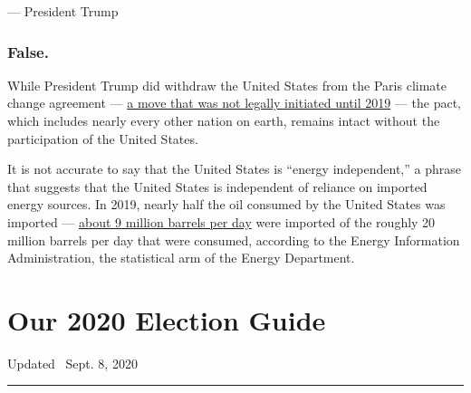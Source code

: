 --- President Trump

\hypertarget{false}{%
\subsubsection{False.}\label{false}}

While President Trump did withdraw the United States from the Paris
climate change agreement ---
\href{https://www.nytimes3xbfgragh.onion/2019/10/23/climate/trump-paris-climate-accord.html}{a
move that was not legally initiated until 2019} --- the pact, which
includes nearly every other nation on earth, remains intact without the
participation of the United States.

It is not accurate to say that the United States is ``energy
independent,'' a phrase that suggests that the United States is
independent of reliance on imported energy sources. In 2019, nearly half
the oil consumed by the United States was imported ---
\href{https://www.eia.gov/tools/faqs/faq.php?id=727\&t=6\#:~:text=In\%202019\%2C\%20the\%20United\%20States,(including\%20ethanol\%20and\%20biodiesel).}{about
9 million barrels per day} were imported of the roughly 20 million
barrels per day that were consumed, according to the Energy Information
Administration, the statistical arm of the Energy Department.

\hypertarget{our-2020-election-guide}{%
\section{Our 2020 Election Guide}\label{our-2020-election-guide}}

Updated ~Sept. 8, 2020

\begin{center}\rule{0.5\linewidth}{\linethickness}\end{center}

